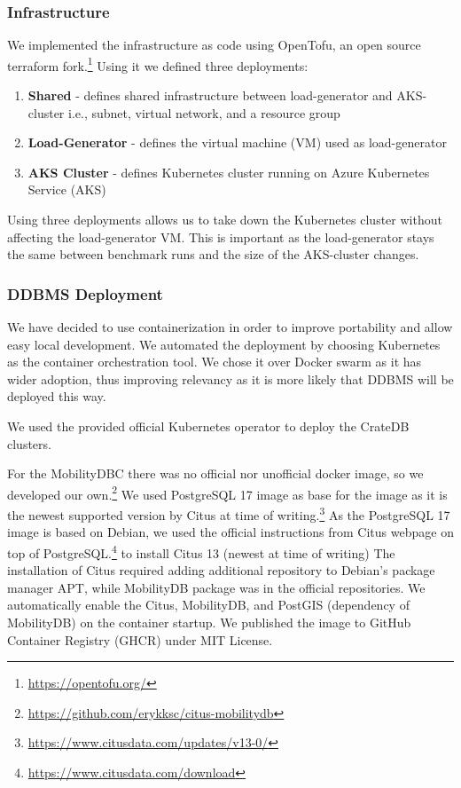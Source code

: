 \subsubsection{Infrastructure}
We implemented the infrastructure as code using OpenTofu, an open source terraform fork.\footnote{\url{https://opentofu.org/}}
Using it we defined three deployments:
\begin{enumerate}
	\item \textbf{Shared} - defines shared infrastructure between load-generator and AKS-cluster i.e., subnet, virtual network, and a resource group
	\item \textbf{Load-Generator} - defines the virtual machine (VM) used as load-generator
	\item \textbf{AKS Cluster} - defines Kubernetes cluster running on Azure Kubernetes Service (AKS)
\end{enumerate}

Using three deployments allows us to take down the Kubernetes cluster without affecting the load-generator VM.
This is important as the load-generator stays the same between benchmark runs and the size of the AKS-cluster changes.

\subsubsection{DDBMS Deployment}

We have decided to use containerization in order to improve portability and allow easy local development.
We automated the deployment by choosing Kubernetes as the container orchestration tool.
We chose it over Docker swarm as it has wider adoption, thus improving relevancy as it is more likely that DDBMS will be deployed this way.

We used the provided official Kubernetes operator to deploy the CrateDB clusters.

For the MobilityDBC there was no official nor unofficial docker image, so we developed our own.\footnote{\url{https://github.com/erykksc/citus-mobilitydb}}
We used PostgreSQL 17 image as base for the image as it is the newest supported version by Citus at time of writing.\footnote{\url{https://www.citusdata.com/updates/v13-0/}}
As the PostgreSQL 17 image is based on Debian, we used the official instructions from Citus webpage on top of PostgreSQL.\footnote{\url{https://www.citusdata.com/download}} to install Citus 13 (newest at time of writing)
The installation of Citus required adding additional repository to Debian's package manager APT, while MobilityDB package was in the official repositories.
We automatically enable the Citus, MobilityDB, and PostGIS (dependency of MobilityDB) on the container startup.
We published the image to GitHub Container Registry (GHCR) under MIT License.

